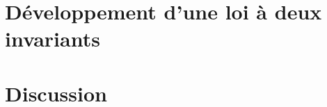 \documentclass[a4paper,11pt]{article}
\begin{document}
\section{Développement d'une loi à deux invariants}




\section{Discussion}




\end{document}
